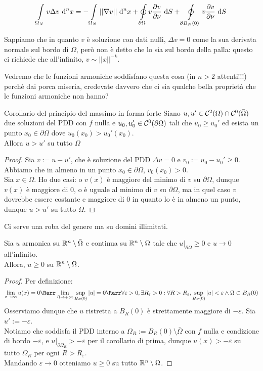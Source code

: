 \documentclass{book}
\begin{document}
\[\int\limits_{\Omega_N} v\Delta v \text{ d}^n x = -\int\limits_{\Omega_N}||\nabla v||\text{ d}^n x + \oint\limits_{\partial \Omega} v \frac{\partial v}{\partial \nu}\text{ d} S + \oint\limits_{\partial B_N(0)} v \frac{\partial v}{\partial \nu}\text{ d} S\]

Sappiamo che in quanto $v$ è soluzione con dati nulli, $\Delta v=0$ come la sua derivata normale sul bordo di $\Omega$, però non è detto che lo sia sul bordo della palla: questo ci richiede che all'infinito, $v\sim ||x||^{-k}$.

Vedremo che le funzioni armoniche soddisfano questa cosa (in $n>2$ attenti!!!) perchè dai porca miseria, credevate davvero che ci sia qualche bella proprietà che le funzioni armoniche non hanno?

\begin{corollary}{Corollario del principio del massimo in forma forte}{}
    Siano $u,u' \in \mathcal{C}^2(\Omega) \cap \mathcal{C}^0(\bar{\Omega})$ due soluzioni del PDD con $f$ nulla e $u_0,u_0' \in \mathcal{C}^0(\partial\Omega)$ tali che $u_0\ge u_0'$ ed esista un punto $x_0 \in \partial\Omega$ dove $u_0(x_0)>u_0'(x_0)$.\\
    Allora $u>u'$ su tutto $\Omega$
\end{corollary}
\begin{proof}
    Sia $v:= u-u'$, che è soluzione del PDD $\Delta v = 0$ e $v_0 := u_0-u_0'\ge 0$. Abbiamo che in almeno in un punto $x_0 \in \partial \Omega$, $v_0(x_0) >0$.\\
    Sia $x \in \Omega$. Ho due casi: o $v(x)$ è maggiore del minimo di $v$ su $\partial \Omega$, dunque $v(x)$ è maggiore di $0$, o è uguale al minimo di $v$ su $\partial \Omega$, ma in quel caso $v$ dovrebbe essere costante e maggiore di $0$ in quanto lo è in almeno un punto, dunque $u>u'$ su tutto $\Omega$.
\end{proof}

Ci serve una roba del genere ma su domini illimitati.

\begin{proposition}{}{}
    Sia $u$ armonica su $\mathbb{R}^n \setminus \bar{\Omega}$ e continua su $\mathbb{R}^n \setminus \Omega$ tale che $u|_{\partial\Omega}\ge 0$ e $u\to 0$ all'infinito.\\
    Allora, $u\ge 0$ su $\mathbb{R}^n \setminus \Omega$.
\end{proposition}
\begin{proof}
    Per definizione:
    \[\lim_{x\to\infty} u(x) = 0 \Rarr \lim_{R\to+\infty}\sup_{B_R(0)}|u| = 0 \Rarr \forall \varepsilon >0, \exists R_\varepsilon > 0 : \forall R>R_\varepsilon, \sup_{B_R(0)}|u| < \varepsilon\wedge \Omega \subset B_R(0)\]
    Osserviamo dunque che $u$ ristretta a $B_R(0)$ è strettamente maggiore di $-\varepsilon$. Sia $u' := -\varepsilon$.\\
    Notiamo che soddisfa il PDD interno a $\Omega_R := B_R(0)\setminus \bar{\Omega}$ con $f$ nulla e condizione di bordo $-\varepsilon$, e $u|_{\partial \Omega_R}>-\varepsilon$ per il corollario di prima, dunque $u(x)>-\varepsilon$ su tutto $\Omega_R$ per ogni $R>R_\varepsilon$.\\
    Mandando $\varepsilon\to 0$ otteniamo $u\ge 0$ su tutto $\mathbb{R}^n \setminus \Omega$.
\end{proof}
\end{document}
